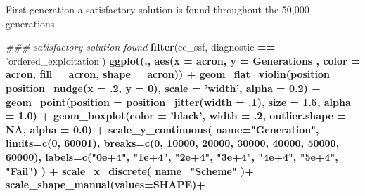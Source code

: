 \documentclass[]{book}
\newenvironment{Shaded}{\begin{snugshade}}{\end{snugshade}}
\newcommand{\CommentTok}[1]{\textcolor[rgb]{0.56,0.35,0.01}{\textit{#1}}}
\newcommand{\DataTypeTok}[1]{\textcolor[rgb]{0.13,0.29,0.53}{#1}}
\newcommand{\DecValTok}[1]{\textcolor[rgb]{0.00,0.00,0.81}{#1}}
\newcommand{\FloatTok}[1]{\textcolor[rgb]{0.00,0.00,0.81}{#1}}
\newcommand{\KeywordTok}[1]{\textcolor[rgb]{0.13,0.29,0.53}{\textbf{#1}}}
\newcommand{\NormalTok}[1]{#1}
\newcommand{\OperatorTok}[1]{\textcolor[rgb]{0.81,0.36,0.00}{\textbf{#1}}}
\newcommand{\OtherTok}[1]{\textcolor[rgb]{0.56,0.35,0.01}{#1}}
\newcommand{\StringTok}[1]{\textcolor[rgb]{0.31,0.60,0.02}{#1}}
\begin{document}
First generation a satisfactory solution is found throughout the 50,000 generations.

\begin{Shaded}
\begin{Highlighting}[]
\CommentTok{### satisfactory solution found}
\KeywordTok{filter}\NormalTok{(cc_ssf, diagnostic }\OperatorTok{==}\StringTok{ 'ordered_exploitation'}\NormalTok{) }\OperatorTok{%>%}
\StringTok{  }\KeywordTok{ggplot}\NormalTok{(., }\KeywordTok{aes}\NormalTok{(}\DataTypeTok{x =}\NormalTok{ acron, }\DataTypeTok{y =}\NormalTok{ Generations , }\DataTypeTok{color =}\NormalTok{ acron, }\DataTypeTok{fill =}\NormalTok{ acron, }\DataTypeTok{shape =}\NormalTok{ acron)) }\OperatorTok{+}
\StringTok{  }\KeywordTok{geom_flat_violin}\NormalTok{(}\DataTypeTok{position =} \KeywordTok{position_nudge}\NormalTok{(}\DataTypeTok{x =} \FloatTok{.2}\NormalTok{, }\DataTypeTok{y =} \DecValTok{0}\NormalTok{), }\DataTypeTok{scale =} \StringTok{'width'}\NormalTok{, }\DataTypeTok{alpha =} \FloatTok{0.2}\NormalTok{) }\OperatorTok{+}
\StringTok{  }\KeywordTok{geom_point}\NormalTok{(}\DataTypeTok{position =} \KeywordTok{position_jitter}\NormalTok{(}\DataTypeTok{width =} \FloatTok{.1}\NormalTok{), }\DataTypeTok{size =} \FloatTok{1.5}\NormalTok{, }\DataTypeTok{alpha =} \FloatTok{1.0}\NormalTok{) }\OperatorTok{+}
\StringTok{  }\KeywordTok{geom_boxplot}\NormalTok{(}\DataTypeTok{color =} \StringTok{'black'}\NormalTok{, }\DataTypeTok{width =} \FloatTok{.2}\NormalTok{, }\DataTypeTok{outlier.shape =} \OtherTok{NA}\NormalTok{, }\DataTypeTok{alpha =} \FloatTok{0.0}\NormalTok{) }\OperatorTok{+}
\StringTok{  }\KeywordTok{scale_y_continuous}\NormalTok{(}
    \DataTypeTok{name=}\StringTok{"Generation"}\NormalTok{,}
    \DataTypeTok{limits=}\KeywordTok{c}\NormalTok{(}\DecValTok{0}\NormalTok{, }\DecValTok{60001}\NormalTok{),}
    \DataTypeTok{breaks=}\KeywordTok{c}\NormalTok{(}\DecValTok{0}\NormalTok{, }\DecValTok{10000}\NormalTok{, }\DecValTok{20000}\NormalTok{, }\DecValTok{30000}\NormalTok{, }\DecValTok{40000}\NormalTok{, }\DecValTok{50000}\NormalTok{, }\DecValTok{60000}\NormalTok{),}
    \DataTypeTok{labels=}\KeywordTok{c}\NormalTok{(}\StringTok{"0e+4"}\NormalTok{, }\StringTok{"1e+4"}\NormalTok{, }\StringTok{"2e+4"}\NormalTok{, }\StringTok{"3e+4"}\NormalTok{, }\StringTok{"4e+4"}\NormalTok{, }\StringTok{"5e+4"}\NormalTok{, }\StringTok{"Fail"}\NormalTok{)}
\NormalTok{  ) }\OperatorTok{+}
\StringTok{  }\KeywordTok{scale_x_discrete}\NormalTok{(}
    \DataTypeTok{name=}\StringTok{"Scheme"}
\NormalTok{  )}\OperatorTok{+}
\StringTok{  }\KeywordTok{scale_shape_manual}\NormalTok{(}\DataTypeTok{values=}\NormalTok{SHAPE)}\OperatorTok{+}
}
\end{Highlighting}
\end{Shaded}
\end{document}
